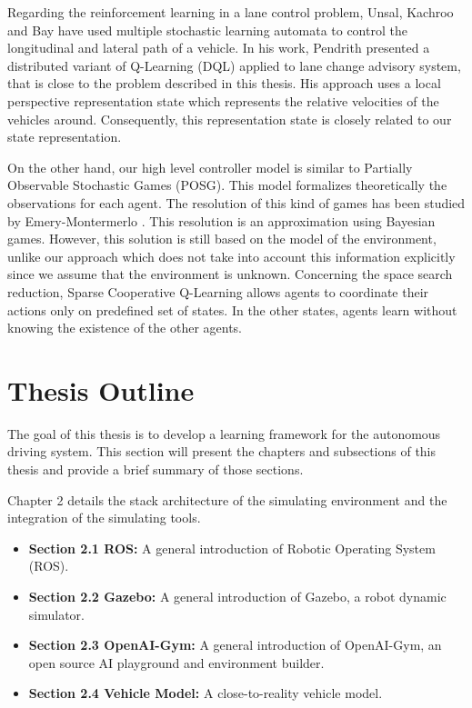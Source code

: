 
Regarding the reinforcement learning in a lane control problem, Unsal, Kachroo and Bay \cite{CACC1999} have used multiple stochastic learning automata to control the longitudinal and lateral path of a vehicle. In his work, Pendrith \cite{DistributedRL-Traffic2000} presented a distributed variant of Q-Learning (DQL) applied to lane change advisory system, that is close to the problem described in this thesis. His approach uses a local perspective representation state which represents the relative velocities of the vehicles around. Consequently, this representation state is closely related to our state representation. 

On the other hand, our high level controller model is similar to Partially Observable Stochastic Games (POSG). This model formalizes theoretically the observations for each agent. The resolution of this kind of games has been studied by Emery-Montermerlo \cite{GameControl2005}. This resolution is an approximation using Bayesian games. However, this solution is still based on the model of the environment, unlike our approach which does not take into account this information explicitly since we assume that the environment is unknown. Concerning the space search reduction, Sparse Cooperative Q-Learning \cite{Sparse2004} allows agents to coordinate their actions only on predefined set of states. In the other states, agents learn without knowing the existence of the other agents.

\section{Thesis Outline}

The goal of this thesis is to develop a learning framework for the autonomous driving system. This section will present the chapters and subsections of this thesis and provide a brief summary of those sections.

Chapter 2 details the stack architecture of the simulating environment and the integration of the simulating tools.

\begin{itemize}
\item \textbf {Section 2.1 ROS:} A general introduction of Robotic Operating System (ROS).
\item \textbf {Section 2.2 Gazebo:} A general introduction of Gazebo, a robot dynamic simulator.
\item \textbf {Section 2.3 OpenAI-Gym:} A general introduction of OpenAI-Gym, an open source AI playground and environment builder.
\item \textbf {Section 2.4 Vehicle Model:} A close-to-reality vehicle model.
\end{itemize}


